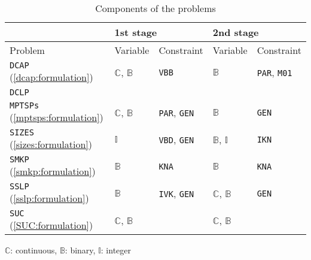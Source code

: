 \begin{table}[H]
	\centering
	\caption{Components of the problems}
	\label{table:prob_class}
	\begin{threeparttable}
		\begin{tabular}{@{}lllll@{}}
			\toprule
			& \multicolumn{2}{l}{1st stage}                              				  	& \multicolumn{2}{l}{2nd stage}                             			        \\ \midrule
			Problem 	     & Variable                    & Constraint                   	& Variable                    & Constraint                  				    \\ \midrule
			\texttt{DCAP} (\ref{dcap:formulation})    & $\mathbb{C}$, $\mathbb{B}$  & \texttt{VBB}                	& $\mathbb{B}$                & \texttt{PAR}, \texttt{M01} 			    		\\
			\texttt{DCLP}  	 &							   &								& 			 	  &													\\				
			\texttt{MPTSPs} (\ref{mptsps:formulation})  & $\mathbb{C}$, $\mathbb{B}$  & \texttt{PAR}, \texttt{GEN}		& $\mathbb{B}$                & \texttt{GEN}               						\\
			\texttt{SIZES} (\ref{sizes:formulation})   & $\mathbb{I}$ 			   & \texttt{VBD}, \texttt{GEN} 	& $\mathbb{B}$, $\mathbb{I}$  & \texttt{IKN}             						\\
			\texttt{SMKP} (\ref{smkp:formulation})   & $\mathbb{B}$                & \texttt{KNA}                	& $\mathbb{B}$                & \texttt{KNA}              						\\
			\texttt{SSLP} (\ref{sslp:formulation})   & $\mathbb{B}$                & \texttt{IVK}, \texttt{GEN} 	& $\mathbb{C}$, $\mathbb{B}$  & \texttt{GEN}             						\\
			\texttt{SUC} (\ref{SUC:formulation})   & $\mathbb{C}$, $\mathbb{B}$                 &                              	& $\mathbb{C}$, $\mathbb{B}$  &                             					\\ \bottomrule
		\end{tabular}
		
		\begin{tablenotes}
			\small
			\item $\mathbb{C}$: continuous, $\mathbb{B}$: binary, $\mathbb{I}$: integer
		\end{tablenotes}
	\end{threeparttable}
\end{table}